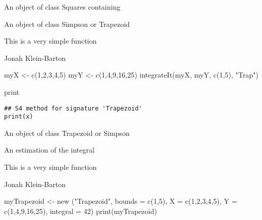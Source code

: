 \documentclass[a4paper]{book}
\begin{document}
%
\begin{Value}
An object of class Squares containing
\begin{ldescription}
\item[\code{object}] An object of class Simpson or Trapezoid
\end{ldescription}
\end{Value}
%
\begin{Note}\relax
This is a very simple function
\end{Note}
%
\begin{Author}\relax
Jonah Klein-Barton
\end{Author}
%
\begin{Examples}
\begin{ExampleCode}

myX <- c(1,2,3,4,5)
myY <- c(1,4,9,16,25)
integrateIt(myX, myY, c(1,5), "Trap")
\end{ExampleCode}
\end{Examples}
%
\begin{Description}\relax
print
\end{Description}
%
\begin{Usage}
\begin{verbatim}
## S4 method for signature 'Trapezoid'
print(x)
\end{verbatim}
\end{Usage}
%
\begin{Arguments}
\begin{ldescription}
\item[\code{x}] An object of class Trapezoid or Simpson
\end{ldescription}
\end{Arguments}
%
\begin{Value}
An estimation of the integral
\end{Value}
%
\begin{Note}\relax
This is a very simple function
\end{Note}
%
\begin{Author}\relax
Jonah Klein-Barton
\end{Author}
%
\begin{Examples}
\begin{ExampleCode}
myTrapezoid <- new ("Trapezoid", bounds = c(1,5), X = c(1,2,3,4,5), Y = c(1,4,9,16,25), integral = 42)
print(myTrapezoid)
\end{ExampleCode}
\end{Examples}
\end{document}
